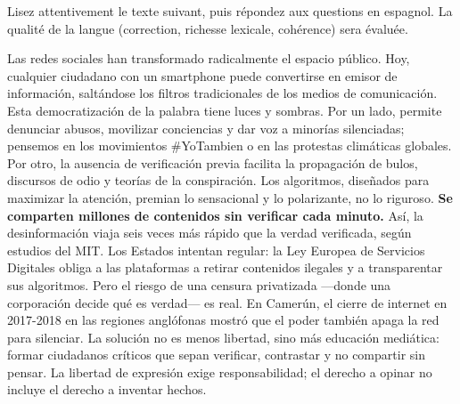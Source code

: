 \documentclass[11pt]{article}
\begin{document}
\begin{exercice}
Lisez attentivement le texte suivant, puis répondez aux questions en espagnol. La qualité de la langue (correction, richesse lexicale, cohérence) sera évaluée.

\begin{textebox}
Las redes sociales han transformado radicalmente el espacio público. Hoy, cualquier ciudadano con un smartphone puede convertirse en emisor de información, saltándose los filtros tradicionales de los medios de comunicación. Esta democratización de la palabra tiene luces y sombras. Por un lado, permite denunciar abusos, movilizar conciencias y dar voz a minorías silenciadas; pensemos en los movimientos \#YoTambien o en las protestas climáticas globales. Por otro, la ausencia de verificación previa facilita la propagación de bulos, discursos de odio y teorías de la conspiración. Los algoritmos, diseñados para maximizar la atención, premian lo sensacional y lo polarizante, no lo riguroso. \textbf{Se comparten millones de contenidos sin verificar cada minuto.} Así, la desinformación viaja seis veces más rápido que la verdad verificada, según estudios del MIT. Los Estados intentan regular: la Ley Europea de Servicios Digitales obliga a las plataformas a retirar contenidos ilegales y a transparentar sus algoritmos. Pero el riesgo de una censura privatizada —donde una corporación decide qué es verdad— es real. En Camerún, el cierre de internet en 2017-2018 en las regiones anglófonas mostró que el poder también apaga la red para silenciar. La solución no es menos libertad, sino más educación mediática: formar ciudadanos críticos que sepan verificar, contrastar y no compartir sin pensar. La libertad de expresión exige responsabilidad; el derecho a opinar no incluye el derecho a inventar hechos.
\end{textebox}


\end{exercice}
\end{document}
